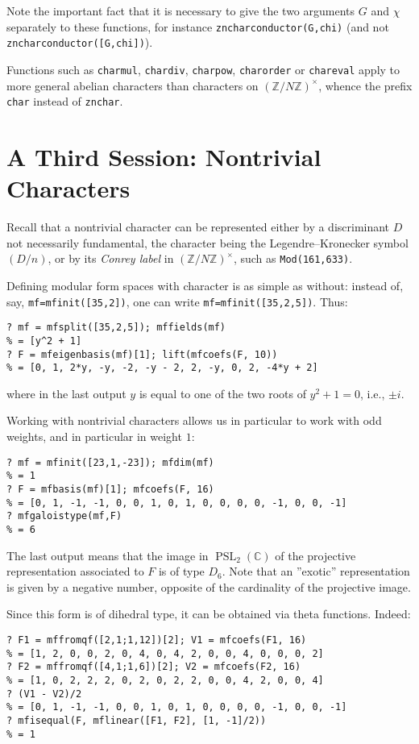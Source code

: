 \documentclass[11pt]{article}
\DeclareMathOperator{\PSL}{PSL}
\newcommand{\Z}{{\mathbb Z}}
\newcommand{\C}{{\mathbb C}}
\def\kbd#1{{\tt #1}}
\begin{document}
Note the important fact that it is necessary to give the two arguments $G$ and
$\chi$ separately to these functions, for instance \kbd{zncharconductor(G,chi)}
(and not \kbd{zncharconductor([G,chi])}).

Functions such as \kbd{charmul}, \kbd{chardiv}, \kbd{charpow},
\kbd{charorder} or \kbd{chareval} apply to more general abelian characters
than characters on $(\Z/N\Z)^\times$, whence the prefix \kbd{char} instead of
\kbd{znchar}.

\section{A Third Session: Nontrivial Characters}

Recall that a nontrivial character can be represented either by a discriminant
$D$ not necessarily fundamental, the character being the Legendre--Kronecker
symbol $(D/n)$, or by its \emph{Conrey label} in $(\Z/N\Z)^\times$, such as
\kbd{Mod(161,633)}.

Defining modular form spaces with character is as simple as without:
instead of, say, \kbd{mf=mfinit([35,2])}, one can write
\kbd{mf=mfinit([35,2,5])}. Thus:

\begin{verbatim}
? mf = mfsplit([35,2,5]); mffields(mf)
% = [y^2 + 1]
? F = mfeigenbasis(mf)[1]; lift(mfcoefs(F, 10))
% = [0, 1, 2*y, -y, -2, -y - 2, 2, -y, 0, 2, -4*y + 2]
\end{verbatim}
where in the last output $y$ is equal to one of the two roots of $y^2+1=0$,
i.e., $\pm i$.

Working with nontrivial characters allows us in particular to work with odd
weights, and in particular in weight $1$:

\begin{verbatim}
? mf = mfinit([23,1,-23]); mfdim(mf)
% = 1
? F = mfbasis(mf)[1]; mfcoefs(F, 16)
% = [0, 1, -1, -1, 0, 0, 1, 0, 1, 0, 0, 0, 0, -1, 0, 0, -1]
? mfgaloistype(mf,F)
% = 6
\end{verbatim}

The last output means that the image in $\PSL_2(\C)$ of the projective
representation associated to $F$ is of type $D_6$. Note that an ''exotic''
representation is given by a negative number, opposite of the cardinality
of the projective image.

Since this form is of dihedral type, it can be obtained via theta functions.
Indeed:

\begin{verbatim}
? F1 = mffromqf([2,1;1,12])[2]; V1 = mfcoefs(F1, 16)
% = [1, 2, 0, 0, 2, 0, 4, 0, 4, 2, 0, 0, 4, 0, 0, 0, 2]
? F2 = mffromqf([4,1;1,6])[2]; V2 = mfcoefs(F2, 16)
% = [1, 0, 2, 2, 2, 0, 2, 0, 2, 2, 0, 0, 4, 2, 0, 0, 4]
? (V1 - V2)/2
% = [0, 1, -1, -1, 0, 0, 1, 0, 1, 0, 0, 0, 0, -1, 0, 0, -1]
? mfisequal(F, mflinear([F1, F2], [1, -1]/2))
% = 1
\end{verbatim}
\end{document}
